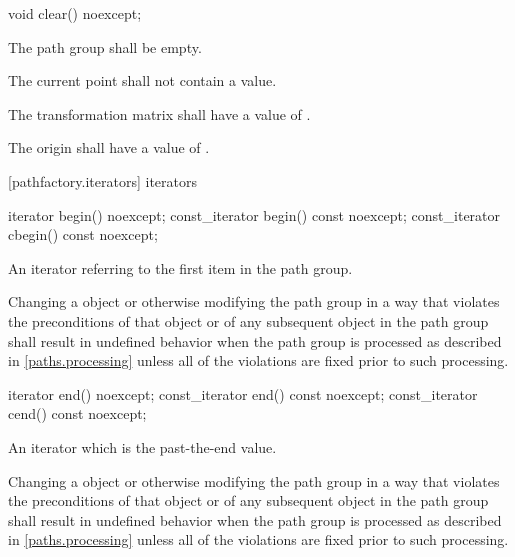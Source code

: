 \begin{itemdecl}
    void clear() noexcept;
\end{itemdecl}
\begin{itemdescr}
	\pnum
	\postconditions
	\pnum
	The path group shall be empty.
	
	\pnum
	The current point shall not contain a value.
	
	\pnum
	The transformation matrix shall have a value of .
	
	\pnum
	The origin shall have a value of .
\end{itemdescr}

 [pathfactory.iterators] { iterators}
    
\begin{itemdecl}
	iterator begin() noexcept;
	const_iterator begin() const noexcept;
	const_iterator cbegin() const noexcept;
\end{itemdecl}
\begin{itemdescr}
	\pnum
	\returns
	An iterator referring to the first  item in the path group.
	
	\pnum
	\remarks
	Changing a  object or otherwise modifying the path group in a way that violates the preconditions of that  object or of any subsequent  object in the path group shall result in undefined behavior when the path group is processed as described in \ref{paths.processing} unless all of the violations are fixed prior to such processing.
\end{itemdescr}

\begin{itemdecl}
	iterator end() noexcept;
	const_iterator end() const noexcept;
	const_iterator cend() const noexcept;
\end{itemdecl}
\begin{itemdescr}
	\pnum
	\returns
	An iterator which is the past-the-end value.
	
	\pnum
	\remarks
	Changing a  object or otherwise modifying the path group in a way that violates the preconditions of that  object or of any subsequent  object in the path group shall result in undefined behavior when the path group is processed as described in \ref{paths.processing} unless all of the violations are fixed prior to such processing.
\end{itemdescr}

